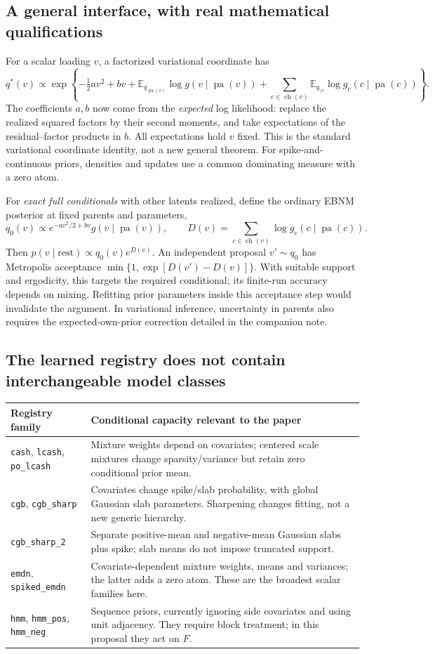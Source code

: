 \documentclass[11pt,a4paper]{article}
\newcommand{\E}{\mathbb E}
\newcommand{\pa}{\operatorname{pa}}
\newcommand{\ch}{\operatorname{ch}}
\numberwithin{equation}{section}
\begin{document}
\subsection{A general interface, with real mathematical qualifications}
For a scalar loading \(v\), a factorized variational coordinate has
\[
q^*(v)\propto
\exp\!\left\{-\tfrac12av^2+bv+
\E_{q_{\pa(v)}}\log g(v\mid\pa(v))+
\sum_{c\in\ch(v)}
\E_{q_{\setminus v}}\log g_c(c\mid\pa(c))\right\}.
\]
The coefficients \(a,b\) now come from the \emph{expected} log likelihood:
replace the realized squared factors by their second moments, and take
expectations of the residual--factor products in \(b\). All expectations
hold \(v\) fixed. This is the standard variational coordinate identity,
not a new general theorem. For spike-and-continuous priors, densities
and updates use a common dominating measure with a zero atom.

For \emph{exact full conditionals} with other latents realized, define
the ordinary EBNM posterior at fixed parents and parameters,
\[
q_0(v)\propto e^{-av^2/2+bv}g(v\mid\pa(v)),\qquad
D(v)=\sum_{c\in\ch(v)}\log g_c(c\mid\pa(c)).
\]
Then \(p(v\mid\mathrm{rest})\propto q_0(v)e^{D(v)}\).
An independent proposal \(v'\sim q_0\) has Metropolis acceptance
\(\min\{1,\exp[D(v')-D(v)]\}\).
With suitable support and ergodicity, this targets the required
conditional; its finite-run accuracy depends on mixing.
Refitting prior parameters inside this acceptance step would invalidate
the argument. In variational inference, uncertainty in parents also
requires the expected-own-prior correction detailed in the companion note.

\subsection{The learned registry does not contain interchangeable model classes}
\begingroup\small
\renewcommand{\arraystretch}{1.10}
\begin{tabular}{@{}P{.30\textwidth}P{.65\textwidth}@{}}
\toprule
Registry family & Conditional capacity relevant to the paper\\
\midrule
\texttt{cash}, \texttt{lcash}, \texttt{po\_lcash}
& Mixture weights depend on covariates; centered scale mixtures change
sparsity/variance but retain zero conditional prior mean.\\[3pt]
\texttt{cgb}, \texttt{cgb\_sharp}
& Covariates change spike/slab probability, with global Gaussian slab
parameters. Sharpening changes fitting, not a new generic hierarchy.\\[3pt]
\texttt{cgb\_sharp\_2}
& Separate positive-mean and negative-mean Gaussian slabs plus spike;
slab means do not impose truncated support.\\[3pt]
\texttt{emdn}, \texttt{spiked\_emdn}
& Covariate-dependent mixture weights, means and variances; the latter
adds a zero atom. These are the broadest scalar families here.\\[3pt]
\texttt{hmm}, \texttt{hmm\_pos}, \texttt{hmm\_neg}
& Sequence priors, currently ignoring side covariates and using unit
adjacency. They require block treatment; in this proposal they act on \(F\).\\
\bottomrule
\end{tabular}
\endgroup
\end{document}

